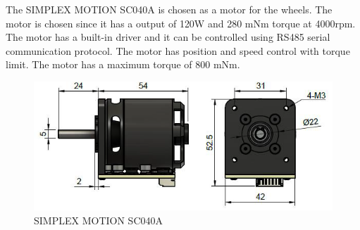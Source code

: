 {The SIMPLEX MOTION SC040A is chosen as a motor for the wheels. The motor is chosen since it has a output of 120W and 280 mNm torque at 4000rpm. The motor has a built-in driver and it can be controlled using RS485 serial communication protocol. The motor has  position and speed control with torque limit. The motor has a maximum torque of 800 mNm.
\begin{figure}[h]
	\centering
	\includegraphics[width=0.5\linewidth]{SIMPLEX_MOTION_SC040A}
	\caption[SIMPLEX MOTION SC040A]{SIMPLEX MOTION SC040A}
	\label{fig:SIMPLEX_MOTION_SC040A}
\end{figure}



}
